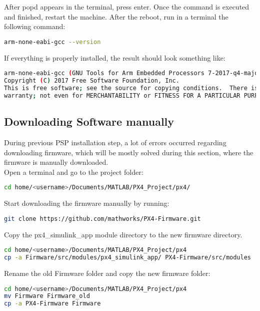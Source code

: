 After popd appears in the terminal, press enter. Once the command is executed and finished, restart the machine. After the reboot, run in a terminal the following command:
\begin{lstlisting}[language=sh]
arm-none-eabi-gcc --version
\end{lstlisting}
If everything is properly installed, the result should look something like:
\begin{lstlisting}[language=sh]
arm-none-eabi-gcc (GNU Tools for Arm Embedded Processors 7-2017-q4-major) 7.2.1 20170904 (release) [ARM/embedded-7-branch revision 255204]
Copyright (C) 2017 Free Software Foundation, Inc.
This is free software; see the source for copying conditions.  There is NO
warranty; not even for MERCHANTABILITY or FITNESS FOR A PARTICULAR PURPOSE.
\end{lstlisting}
\subsection{Downloading Software manually}\label{Downloading Software manually}
During previous PSP installation step, a lot of errors occurred regarding downloading firmware, which will be mostly solved during this section, where the firmware is manually downloaded.\\
\newline
Open a terminal and go to the project folder:
\begin{lstlisting}[language=sh]
cd home/<username>/Documents/MATLAB/PX4_Project/px4/
\end{lstlisting}
Start downloading the firmware manually by running:
\begin{lstlisting}[language=sh]
git clone https://github.com/mathworks/PX4-Firmware.git
\end{lstlisting}
Copy the px4\_simulink\_app module directory to the new firmware directory.
\begin{lstlisting}[language=sh]
cd home/<username>/Documents/MATLAB/PX4_Project/px4
cp -a Firmware/src/modules/px4_simulink_app/ PX4-Firmware/src/modules
\end{lstlisting}
Rename the old Firmware folder and copy the new firmware folder:
\begin{lstlisting}[language=sh]
cd home/<username>/Documents/MATLAB/PX4_Project/px4
mv Firmware Firmware_old
cp -a PX4-Firmware Firmware
\end{lstlisting}
